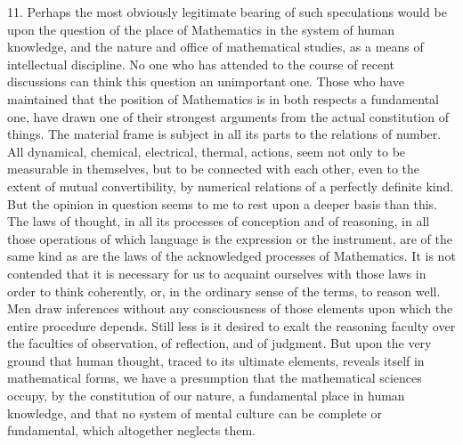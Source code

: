\documentclass[oneside]{book}
\begin{document}
11. Perhaps the most obviously legitimate bearing of such
speculations would be upon the question of the place of Mathematics
in the system of human knowledge, and the nature
and office of mathematical studies, as a means of intellectual
discipline. No one who has attended to the course of recent
discussions can think this question an unimportant one. Those
who have maintained that the position of Mathematics is in
both respects a fundamental one, have drawn one of their strongest
arguments from the actual constitution of things. The material
frame is subject in all its parts to the relations of number.
All dynamical, chemical, electrical, thermal, actions, seem not
only to be measurable in themselves, but to be connected with
each other, even to the extent of mutual convertibility, by numerical
relations of a perfectly definite kind. But the opinion
in question seems to me to rest upon a deeper basis than this.
The laws of thought, in all its processes of conception and of
reasoning, in all those operations of which language is the expression
or the instrument, are of the same kind as are the laws
of the acknowledged processes of Mathematics. It is not contended
that it is necessary for us to acquaint ourselves with those
laws in order to think coherently, or, in the ordinary sense of
the terms, to reason well. Men draw inferences without any
consciousness of those elements upon which the entire procedure
depends. Still less is it desired to exalt the reasoning faculty
over the faculties of observation, of reflection, and of judgment.
But upon the very ground that human thought, traced to its
ultimate elements, reveals itself in mathematical forms, we have
a presumption that the mathematical sciences occupy, by the
constitution of our nature, a fundamental place in human knowledge, and that no system of mental culture can be complete or
fundamental, which altogether neglects them.
\end{document}

